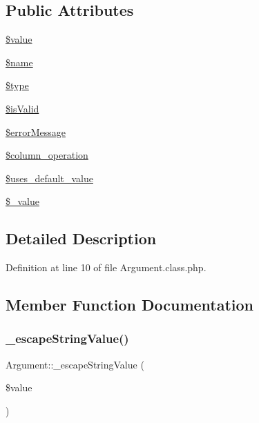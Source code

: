 \subsection*{Public Attributes}
\begin{DoxyCompactItemize}
\item 
\hyperlink{classArgument_a762eb8881d615f61189bba09b9bd7300}{\$value}
\item 
\hyperlink{classArgument_ab37a45cb92464255505b2f4f35909da6}{\$name}
\item 
\hyperlink{classArgument_a7a2272bc3d12787f80143fbea01698f4}{\$type}
\item 
\hyperlink{classArgument_af1a5d4055fd3e16bea7951843a3bdd92}{\$is\+Valid}
\item 
\hyperlink{classArgument_ad0af83b11507626a9c95fd188e60b592}{\$error\+Message}
\item 
\hyperlink{classArgument_a366cb3ac7d44ed1037c96ca2bfad6be4}{\$column\+\_\+operation}
\item 
\hyperlink{classArgument_a3f8f20477043da002ba9d48ede482baf}{\$uses\+\_\+default\+\_\+value}
\item 
\hyperlink{classArgument_aba96b050a81b62ccf10a78638d208353}{\$\+\_\+value}
\end{DoxyCompactItemize}


\subsection{Detailed Description}


Definition at line 10 of file Argument.\+class.\+php.



\subsection{Member Function Documentation}
\hypertarget{classArgument_afd7b071db98f0a4c8ef60cdd8db8a3b2}{}\label{classArgument_afd7b071db98f0a4c8ef60cdd8db8a3b2} 
\subsubsection{\texorpdfstring{\+\_\+escape\+String\+Value()}{\_escapeStringValue()}}
{\footnotesize\ttfamily Argument\+::\+\_\+escape\+String\+Value (\begin{DoxyParamCaption}\item[{}]{\$value }\end{DoxyParamCaption})}

